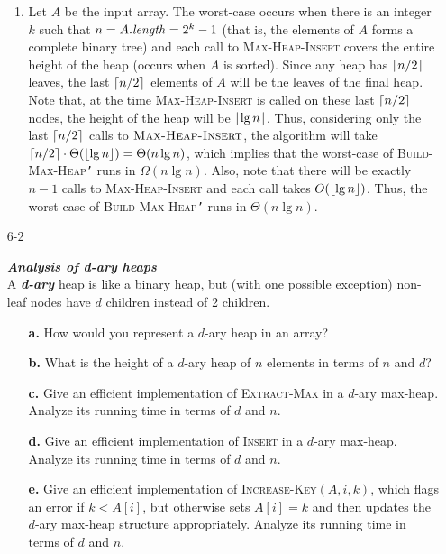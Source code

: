 \begin{enumerate}
\begin{framed}
\begin{enumerate}
\item Let $A$ be the input array. The worst-case occurs when there is an integer
$k$ such that $n = A.\text{\emph{length}} = 2^k - 1$ (that is, the elements of
$A$ forms a complete binary tree) and each call to \textsc{Max-Heap-Insert}
covers the entire height of the heap (occurs when $A$ is sorted). Since any heap
has $\lceil n/2\rceil$ leaves, the last $\lceil n/2\rceil$ elements of $A$ will be the
leaves of the final heap. Note that, at the time \textsc{Max-Heap-Insert} is
called on these last $\lceil n/2\rceil$ nodes, the height of the heap will be
$\lfloor\lg n\rfloor$. Thus, considering only the last $\lceil n/2\rceil$ calls to
$\textsc{Max-Heap-Insert}$, the algorithm will take $\lceil n/2\rceil \cdot
\Theta(\lfloor\lg n\rfloor) = \Theta(n \lg n)$, which implies that the worst-case
of \textsc{Build-Max-Heap\texttt{'}} runs in $\Omega(n \lg n)$. Also, note
that there will be exactly $n - 1$ calls to \textsc{Max-Heap-Insert} and
each call takes $O(\lfloor\lg n\rfloor)$. Thus, the worst-case of
\textsc{Build-Max-Heap\texttt{'}} runs in $\Theta(n \lg n)$.
\end{enumerate}
\end{framed}

\newpage

\item[6{-}2]{\textbf{\emph{Analysis of d-ary heaps}}\\
A \textbf{\emph{d-ary}} heap is like a binary heap, but (with one possible
exception) non-leaf nodes have $d$ children instead of 2 children.
\begin{enumerate}
\item[\textbf{a.}] How would you represent a $d$-ary heap in an array?
\item[\textbf{b.}] What is the height of a $d$-ary heap of $n$ elements in terms
of $n$ and $d$?
\item[\textbf{c.}] Give an efficient implementation of \textsc{Extract-Max} in
a $d$-ary max-heap. Analyze its running time in terms of $d$ and $n$.
\item[\textbf{d.}] Give an efficient implementation of \textsc{Insert} in
a $d$-ary max-heap. Analyze its running time in terms of $d$ and $n$.
\item[\textbf{e.}] Give an efficient implementation of
\textsc{Increase-Key}$(A, i, k)$, which flags an error if $k < A[i]$, but
otherwise sets $A[i] = k$ and then updates the $d$-ary max-heap structure
appropriately. Analyze its running time in terms of $d$ and $n$.
\end{enumerate}
}


\end{enumerate}
